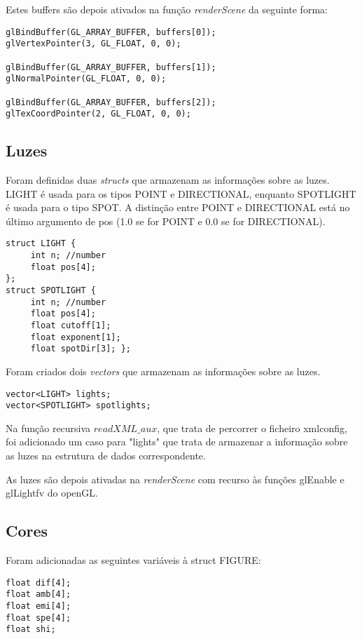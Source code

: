 \documentclass[11pt,a4paper]{report}
\begin{document}
Estes buffers são depois ativados na função \emph{renderScene} da seguinte forma:
\begin{lstlisting}[style = code]
glBindBuffer(GL_ARRAY_BUFFER, buffers[0]);
glVertexPointer(3, GL_FLOAT, 0, 0);

glBindBuffer(GL_ARRAY_BUFFER, buffers[1]);
glNormalPointer(GL_FLOAT, 0, 0);

glBindBuffer(GL_ARRAY_BUFFER, buffers[2]);
glTexCoordPointer(2, GL_FLOAT, 0, 0);
\end{lstlisting}

\subsection{Luzes}
Foram definidas duas \emph{structs} que armazenam as informações sobre as luzes. LIGHT é usada para os tipos POINT e DIRECTIONAL, enquanto SPOTLIGHT é usada para o tipo SPOT. A distinção entre POINT e DIRECTIONAL está no último argumento de pos (1.0 se for POINT e 0.0 se for DIRECTIONAL).

\begin{lstlisting}[style = code]
struct LIGHT {
	 int n; //number
	 float pos[4];
};
struct SPOTLIGHT {
	 int n; //number
	 float pos[4];
	 float cutoff[1];
	 float exponent[1];
	 float spotDir[3]; };
\end{lstlisting}

Foram criados dois \emph{vectors} que armazenam as informações sobre as luzes.

\begin{lstlisting}[style = code]
vector<LIGHT> lights;
vector<SPOTLIGHT> spotlights;
\end{lstlisting}

Na função recursiva {$readXML\_aux$}, que trata de percorrer o ficheiro xmlconfig, foi adicionado um caso para "lights" que trata de armazenar a informação sobre as luzes na estrutura de dados correspondente.

As luzes são depois ativadas na \emph{renderScene} com recurso às funções glEnable e glLightfv do openGL.

\subsection{Cores}
Foram adicionadas as seguintes variáveis à struct FIGURE:
\begin{lstlisting}[style = code]
float dif[4];
float amb[4];
float emi[4];
float spe[4];
float shi;
\end{lstlisting}
\end{document}
